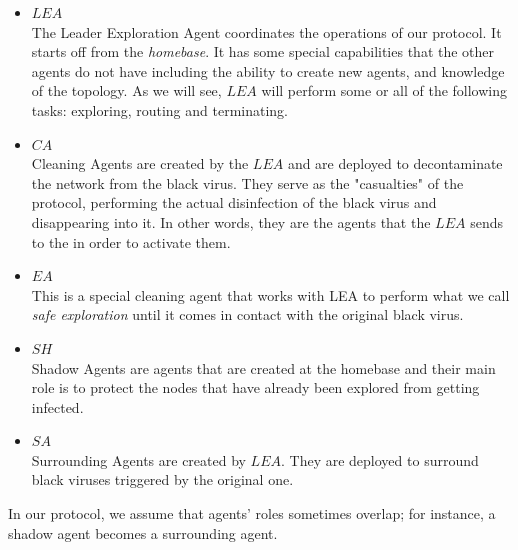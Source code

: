 \begin{itemize}
\item  $LEA$ \\
The Leader Exploration Agent coordinates the operations of our protocol. It starts off from the {\em homebase}. It has some special  capabilities that the other agents do not have including the ability to create new agents, and knowledge of the topology. As we will see, $LEA$ will perform some or all of the following tasks: exploring, routing and terminating.

\item $CA$ \\
Cleaning Agents are created by the $LEA$ and are deployed to decontaminate the network from the black virus.
They serve as the "casualties" of the protocol, performing the actual  disinfection of the black virus and disappearing into it. In other words, they are the agents that the $LEA$ sends to the \bvs in order to  activate them. 
 
\item $EA$ \\ 
This is  a special cleaning agent  that works with  LEA   to perform what we call  {\em safe exploration} until it comes in contact with the original black virus.  

\item $SH$ \\
Shadow Agents are agents that are created at the homebase and their main role is to protect  the
nodes that have already been explored from getting infected. 



\item $SA$ \\
Surrounding Agents are created by  $LEA$. 
They are deployed to surround  black viruses triggered by the original one.


\end{itemize}
In our protocol, we assume that  agents' roles sometimes overlap; for instance, a shadow agent becomes a surrounding agent. 



